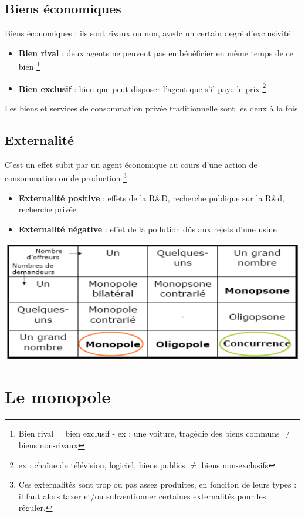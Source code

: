 \subsection{Biens économiques}
Biens économiques : ils sont rivaux ou non, avedc un certain degré d'exclusivité
\begin{itemize}
    \item \textbf{Bien rival} : deux agents ne peuvent pas en bénéficier en même temps de ce bien \footnote{Bien rival = bien exclusif - ex : une voiture, tragédie des biens communs $\neq$ biens non-rivaux}
    \item \textbf{Bien exclusif} : bien que peut disposer l'agent que s'il paye le prix \footnote{ex : chaîne de télévision, logiciel, biens publics $\neq$ biens non-exclusifs}
\end{itemize}
Les biens et services de consommation privée traditionnelle sont les deux à la fois.
\subsection{Externalité}
C'est un effet subit par un agent économique au cours d'une action de consommation ou de production \footnote{Ces externalités sont trop ou pas assez produites, en fonciton de leurs types : il faut alors taxer et/ou subventionner certaines externalités pour les réguler.}
\begin{itemize}
    \item \textbf{Externalité positive} : effets de la R\&D, recherche publique sur la R\&d, recherche privée
    \item \textbf{Externalité négative} : effet de la pollution dûs aux rejets d'une usine
\end{itemize}
\begin{center}
    \includegraphics[scale=0.7]{Pics/defaillance_marche.png}
\end{center}
\newpage
\section{Le monopole}
